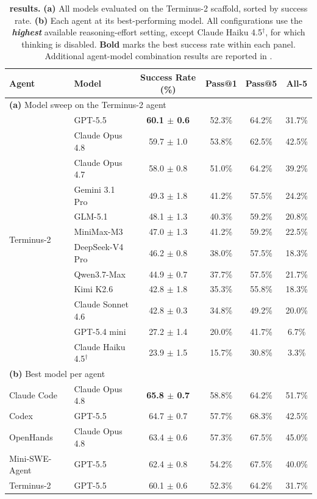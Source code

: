\begin{table}[t]
\centering
\small
\caption{\textbf{\benchname results.} \textbf{(a)} All models evaluated on the Terminus-2 scaffold, sorted by success rate. \textbf{(b)} Each agent at its best-performing model. All configurations use the \textbf{\emph{highest}} available reasoning-effort setting, except Claude Haiku 4.5$^\dagger$, for which thinking is disabled. \textbf{Bold} marks the best success rate within each panel. Additional agent-model combination results are reported in .}
\label{tab:two-panel}
\setlength{\tabcolsep}{10pt}
\renewcommand{\arraystretch}{1.05}
\begin{tabular}{l l c c c c}
\toprule
Agent & Model & Success Rate (\%) & Pass@1 & Pass@5 & All-5 \\
\midrule
\multicolumn{6}{l}{\textbf{(a)} Model sweep on the Terminus-2 agent} \\
\midrule
\multirow{12}{*}{Terminus-2}
 & GPT-5.5              & \textbf{60.1 $\pm$ 0.6} & 52.3\% & 64.2\% & 31.7\% \\
 & Claude Opus 4.8      & 59.7 $\pm$ 1.0 & 53.8\% & 62.5\% & 42.5\% \\
 & Claude Opus 4.7      & 58.0 $\pm$ 0.8 & 51.0\% & 64.2\% & 39.2\% \\
 & Gemini 3.1 Pro & 49.3 $\pm$ 1.8 & 41.2\% & 57.5\% & 24.2\% \\
 & GLM-5.1              & 48.1 $\pm$ 1.3 & 40.3\% & 59.2\% & 20.8\% \\
 & MiniMax-M3           & 47.0 $\pm$ 1.3 & 41.2\% & 59.2\% & 22.5\% \\
 & DeepSeek-V4 Pro      & 46.2 $\pm$ 0.8 & 38.0\% & 57.5\% & 18.3\% \\
 & Qwen3.7-Max          & 44.9 $\pm$ 0.7 & 37.7\% & 57.5\% & 21.7\% \\
 & Kimi K2.6            & 42.8 $\pm$ 1.8 & 35.3\% & 55.8\% & 18.3\% \\
 & Claude Sonnet 4.6    & 42.8 $\pm$ 0.3 & 34.8\% & 49.2\% & 20.0\% \\
 & GPT-5.4 mini         & 27.2 $\pm$ 1.4 & 20.0\% & 41.7\% & 6.7\%  \\
 & Claude Haiku 4.5$^\dagger$     & 23.9 $\pm$ 1.5 & 15.7\% & 30.8\% & 3.3\%  \\
\midrule
\multicolumn{6}{l}{\textbf{(b)} Best model per agent} \\
\midrule
Claude Code & Claude Opus 4.8 & \textbf{65.8 $\pm$ 0.7} & 58.8\% & 64.2\% & 51.7\% \\
Codex          & GPT-5.5          & 64.7 $\pm$ 0.7 & 57.7\% & 68.3\% & 42.5\% \\
OpenHands      & Claude Opus 4.8  & 63.4 $\pm$ 0.6 & 57.3\% & 67.5\% & 45.0\% \\
Mini-SWE-Agent & GPT-5.5          & 62.4 $\pm$ 0.8 & 54.2\% & 67.5\% & 40.0\% \\
Terminus-2     & GPT-5.5          & 60.1 $\pm$ 0.6 & 52.3\% & 64.2\% & 31.7\% \\
\bottomrule
\end{tabular}
\end{table}

